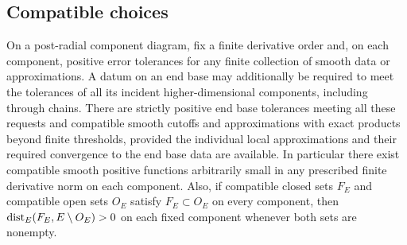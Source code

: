 \subsection{Compatible choices}

\begin{lemma}\label{component:approximation}
On a post-radial component diagram, fix a finite derivative order and,
on each component, positive error tolerances for any finite collection of
smooth data or approximations.  A datum on an end base may additionally be
required to meet the tolerances of all its incident higher-dimensional components, including
through chains.  There are strictly positive end base tolerances meeting all these
requests and compatible smooth cutoffs and approximations with exact
products beyond finite thresholds,
provided the individual local approximations and their required
convergence to the end base data are available.
In particular there exist compatible smooth positive functions
arbitrarily small in any prescribed finite derivative norm on each
component.  Also, if compatible closed sets $F_E$ and compatible open sets
$O_E$ satisfy $F_E\subset O_E$ on every component, then
$\operatorname{dist}_E(F_E,E\setminus O_E)>0$ on each fixed component whenever both
sets are nonempty.
\end{lemma}

